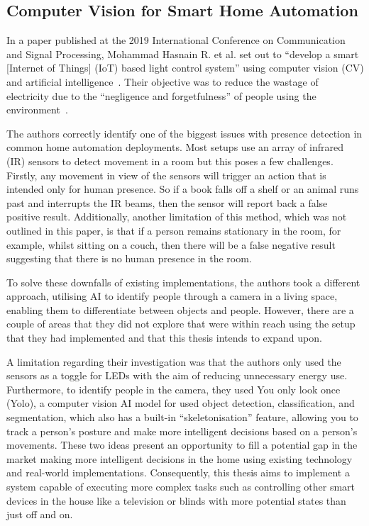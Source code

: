 \subsection{Computer Vision for Smart Home Automation}
In a paper published at the 2019 International Conference on Communication and Signal Processing, Mohammad Hasnain R. et al. set out to ``develop a smart [Internet of Things] (IoT) based light control system'' using computer vision (CV) and artificial intelligence~\cite{Hasn19}.
Their objective was to reduce the wastage of electricity due to the ``negligence and forgetfulness'' of people using the environment~\cite{Hasn19}.

The authors correctly identify one of the biggest issues with presence detection in common home automation deployments.
Most setups use an array of infrared (IR) sensors to detect movement in a room but this poses a few challenges.
Firstly, any movement in view of the sensors will trigger an action that is intended only for human presence.
So if a book falls off a shelf or an animal runs past and interrupts the IR beams, then the sensor will report back a false positive result.
Additionally, another limitation of this method, which was not outlined in this paper, is that if a person remains stationary in the room, for example, whilst sitting on a couch, then there will be a false negative result suggesting that there is no human presence in the room.

To solve these downfalls of existing implementations, the authors took a different approach, utilising AI to identify people through a camera in a living space, enabling them to differentiate between objects and people.
However, there are a couple of areas that they did not explore that were within reach using the setup that they had implemented and that this thesis intends to expand upon.

A limitation regarding their investigation was that the authors only used the sensors as a toggle for LEDs with the aim of reducing unnecessary energy use.
Furthermore, to identify people in the camera, they used You only look once (Yolo), a computer vision AI model for used object detection, classification, and segmentation, which also has a built-in ``skeletonisation'' feature, allowing you to track a person's posture and make more intelligent decisions based on a person's movements.
These two ideas present an opportunity to fill a potential gap in the market making more intelligent decisions in the home using existing technology and real-world implementations.
Consequently, this thesis aims to implement a system capable of executing more complex tasks such as controlling other smart devices in the house like a television or blinds with more potential states than just off and on.

